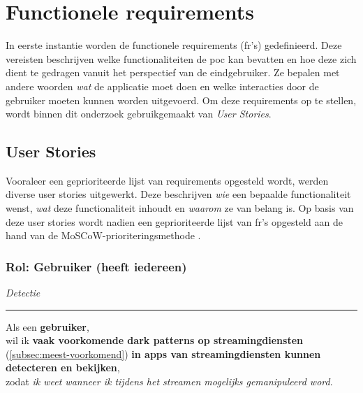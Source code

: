 \newpage

\section{Functionele requirements}
\label{sec:fr}

\vspace{1em}

In eerste instantie worden de functionele requirements (\acrshort{fr}'s) gedefinieerd. Deze vereisten beschrijven welke functionaliteiten de \acrshort{poc} kan bevatten en hoe deze zich dient te gedragen vanuit het perspectief van de eindgebruiker. Ze bepalen met andere woorden \textit{wat} de applicatie moet doen en welke interacties door de gebruiker moeten kunnen worden uitgevoerd. Om deze requirements op te stellen, wordt binnen dit onderzoek gebruikgemaakt van \textit{User Stories}.

\vspace{1em}

\subsection{User Stories}

\vspace{1em}

Vooraleer een geprioriteerde lijst van requirements opgesteld wordt, werden diverse user stories uitgewerkt. Deze beschrijven \textit{wie} een bepaalde functionaliteit wenst, \textit{wat} deze functionaliteit inhoudt en \textit{waarom} ze van belang is. Op basis van deze user stories wordt nadien een geprioriteerde lijst van \acrshort{fr}'s opgesteld aan de hand van de MoSCoW-prioriteringsmethode \autocite{AgileBusinessMoSCoW}.

\vspace{1em}

\subsubsection{Rol: Gebruiker (heeft iedereen)}

\vspace{1em}

\textit{Detectie}
\vspace{0.5em}
\hrule
\vspace{1.2em}

Als een \textbf{gebruiker}, \\
wil ik \textbf{vaak voorkomende dark patterns op streamingdiensten} (\ref{subsec:meest-voorkomend}) \textbf{in apps van streamingdiensten kunnen detecteren en bekijken}, \\
zodat \textit{ik weet wanneer ik tijdens het streamen mogelijks gemanipuleerd word}.

